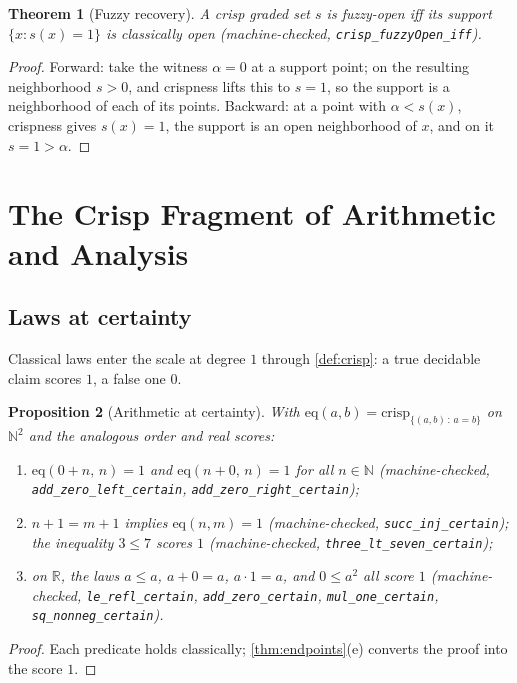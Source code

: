 \documentclass[11pt,a4paper]{article}
\newtheorem{theorem}{Theorem}[section]
\newtheorem{proposition}[theorem]{Proposition}
\newcommand{\Real}{\mathbb{R}}
\newcommand{\Nat}{\mathbb{N}}
\begin{document}
\begin{theorem}[Fuzzy recovery]
\label{thm:fuzzy}
A crisp graded set $s$ is fuzzy-open iff its support
$\{x : s(x) = 1\}$ is classically open
(machine-checked, \texttt{crisp\_fuzzyOpen\_iff}).
\end{theorem}
\begin{proof}
Forward: take the witness $\alpha = 0$ at a support point; on the
resulting neighborhood $s > 0$, and crispness lifts this to $s = 1$,
so the support is a neighborhood of each of its points.
Backward: at a point with $\alpha < s(x)$, crispness gives
$s(x) = 1$, the support is an open neighborhood of $x$, and on it
$s = 1 > \alpha$.
\end{proof}

\section{The Crisp Fragment of Arithmetic and Analysis}
\label{sec:analysis}

\subsection{Laws at certainty}

Classical laws enter the scale at degree $1$ through
\cref{def:crisp}: a true decidable claim scores $1$, a false one $0$.

\begin{proposition}[Arithmetic at certainty]
\label{thm:arith}
With $\mathrm{eq}(a,b) = \mathrm{crisp}_{\{(a,b) \,:\, a = b\}}$ on
$\Nat^2$ and the analogous order and real scores:
\begin{enumerate}[label=\textup{(\alph*)},nosep]
\item $\mathrm{eq}(0 + n,\, n) = 1$ and $\mathrm{eq}(n + 0,\, n) = 1$
  for all $n \in \Nat$
  (machine-checked, \texttt{add\_zero\_left\_certain},
  \texttt{add\_zero\_right\_certain});
\item $n + 1 = m + 1$ implies $\mathrm{eq}(n, m) = 1$
  (machine-checked, \texttt{succ\_inj\_certain});
  the inequality $3 \le 7$ scores $1$
  (machine-checked, \texttt{three\_lt\_seven\_certain});
\item on $\Real$, the laws $a \le a$, $a + 0 = a$, $a \cdot 1 = a$, and
  $0 \le a^2$ all score $1$
  (machine-checked, \texttt{le\_refl\_certain},
  \texttt{add\_zero\_certain}, \texttt{mul\_one\_certain},
  \texttt{sq\_nonneg\_certain}).
\end{enumerate}
\end{proposition}
\begin{proof}
Each predicate holds classically; \cref{thm:endpoints}(e) converts the
proof into the score $1$.
\end{proof}
\end{document}
